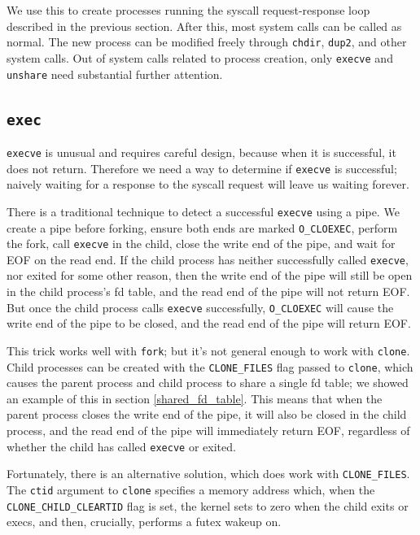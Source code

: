 \documentclass[letterpaper,twocolumn,10pt]{article}
\begin{document}
We use this to create processes running the syscall request-response loop described in the previous section.
After this,
most system calls can be called as normal.
The new process can be modified freely through \texttt{chdir}, \texttt{dup2}, and other system calls.
Out of system calls related to process creation,
only \texttt{execve} and \texttt{unshare} need substantial further attention.
\subsection{\texttt{exec}}\label{execve}
\texttt{execve} is unusual and requires careful design,
because when it is successful, it does not return.
Therefore we need a way to determine if \texttt{execve} is successful;
naively waiting for a response to the syscall request will leave us waiting forever.

There is a traditional technique to detect a successful \texttt{execve} using a pipe.
We create a pipe before forking,
ensure both ends are marked \verb|O_CLOEXEC|,
perform the fork,
call \texttt{execve} in the child,
close the write end of the pipe,
and wait for EOF on the read end.
If the child process has neither successfully called \texttt{execve}, nor exited for some other reason,
then the write end of the pipe will still be open in the child process's fd table,
and the read end of the pipe will not return EOF.
But once the child process calls \texttt{execve} successfully,
\verb|O_CLOEXEC| will cause the write end of the pipe to be closed,
and the read end of the pipe will return EOF.

This trick works well with \texttt{fork};
but it's not general enough to work with \texttt{clone}.
Child processes can be created with the \verb|CLONE_FILES| flag passed to \texttt{clone},
which causes the parent process and child process to share a single fd table;
we showed an example of this in section \ref{shared_fd_table}.
This means that when the parent process closes the write end of the pipe,
it will also be closed in the child process,
and the read end of the pipe will immediately return EOF,
regardless of whether the child has called \texttt{execve} or exited.

Fortunately, there is an alternative solution, which does work with \verb|CLONE_FILES|.
The \texttt{ctid} argument to \texttt{clone} specifies a memory address which,
when the \verb|CLONE_CHILD_CLEARTID| flag is set,
the kernel sets to zero when the child exits or execs,
and then, crucially, performs a futex wakeup on.
\end{document}
